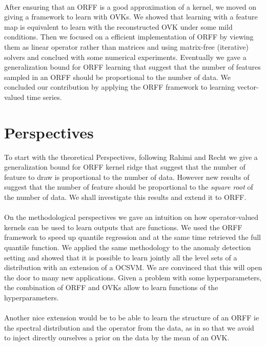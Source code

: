 \paragraph{}
After ensuring that an \acs{ORFF} is a good approximation of a kernel, we
moved on giving a framework to learn with \aclp{OVK}. We showed that
learning with a feature map is equivalent to learn with the reconstructed
\acs{OVK} under some mild conditions. Then we focused on a efficient
implementation of \acs{ORFF} by viewing them as linear operator rather than
matrices and using matrix-free (iterative) solvers and conclued with some
numerical experiments. Eventually we gave a generalization bound for
\acs{ORFF} learning that suggest that the number of features sampled in an
\acs{ORFF} should be proportional to the number of data. We concluded our
contribution by applying the \acs{ORFF} framework to learning vector-valued
time series.

\section{Perspectives}
To start with the theoretical Perspectives, following Rahimi and Recht we
give a generalization bound for \acs{ORFF} kernel ridge that suggest that
the number of feature to draw is proportional to the number of data.
However new results of \citet{rudi2016generalization} suggest that the
number of feature should be proportional to the \emph{square root} of the
number of data. We shall investigate this results and extend it to
\acs{ORFF}.
\paragraph{}
On the methodological perspectives we gave an intuition on how operator-valued
kernels can be used to learn outputs that are functions. We used the \acs{ORFF}
framework to speed up quantile regression and at the same time retrieved the
full quantile function. We applied the same methodology to the anomaly
detection setting and showed that it is possible to learn jointly all the level
sets of a distribution with an extension of a \acl{OCSVM}. We are convinced
that this will open the door to many new applications. Given a problem with
some hyperparameters, the combination of \acs{ORFF} and \aclp{OVK} allow to
learn functions of the hyperparameters.
\paragraph{}
Another nice extension would be to be able to learn the structure of an
\acs{ORFF} \acs{ie} the spectral distribution and the operator from the data,
as in \citet{Yang2015} so that we avoid to inject directly ourselves a prior on
the data by the mean of an \acl{OVK}.
